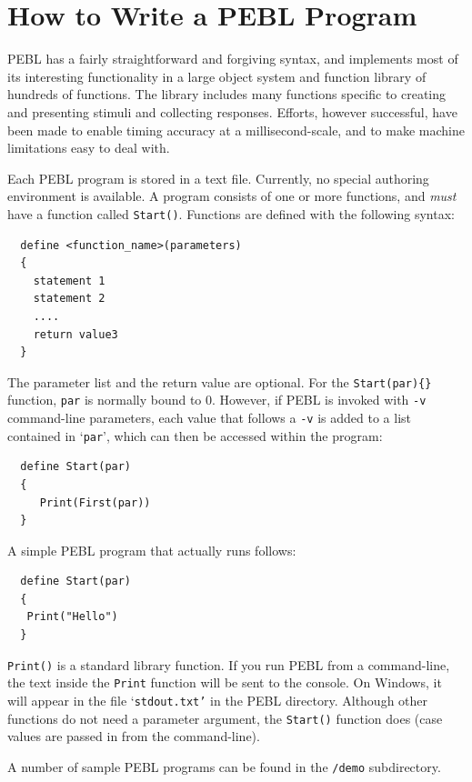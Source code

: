 
\chapter{How to Write a PEBL Program}

\vfill
{}

PEBL has a fairly straightforward and forgiving syntax, and implements
most of its interesting functionality in a large object system and
function library of hundreds of functions.  The library includes many
functions specific to creating and presenting stimuli and collecting
responses.  Efforts, however successful, have been made to enable
timing accuracy at a millisecond-scale, and to make machine limitations
easy to deal with.


Each PEBL program is stored in a text file. Currently, no
special authoring environment is available. A program
consists of one or more functions, and \emph{must} have a function
called \texttt{Start()}. Functions are defined with the following
syntax:
\begin{verbatim}
  define <function_name>(parameters)
  {
    statement 1
    statement 2
    ....
    return value3
  }
\end{verbatim}
The parameter list and the return value are optional.  For the
\verb+Start(par){}+ function, \texttt{par} is normally bound to 0.
However, if PEBL is invoked with \texttt{-v} command-line parameters,
each value that follows a \texttt{-v} is added to a list contained in
`\texttt{par}', which can then be accessed within the program:
\begin{verbatim}
  define Start(par)
  {
     Print(First(par))
  }
\end{verbatim}
A simple PEBL program that actually runs follows:
\begin{verbatim}
  define Start(par)
  {
   Print("Hello")
  }
\end{verbatim}
\texttt{Print()} is a standard library function. If you run PEBL from a
command-line, the text inside the \texttt{Print} function will be sent to the
console. On Windows, it will appear in the file `\texttt{stdout.txt'} in the
PEBL directory.  Although other functions do not need a parameter
argument, the \texttt{Start()} function does (case values are passed in
from the command-line).

A number of sample PEBL programs can be found in the \texttt{/demo}
 subdirectory.



\vfill
{}

